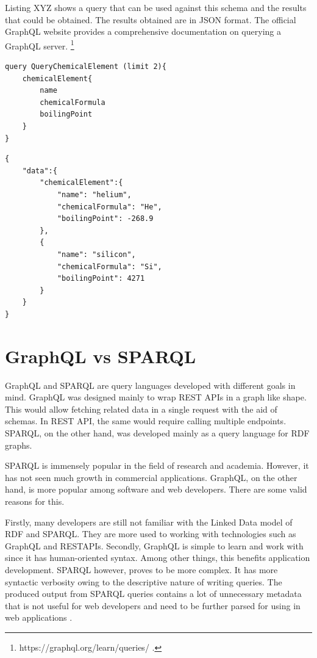 Listing XYZ shows a query that can be used against this schema and the results that could be obtained. The results obtained are in JSON format. The official GraphQL website provides a comprehensive documentation on querying a GraphQL server. \footnote{ https://graphql.org/learn/queries/ .} 

\begin{minipage}{\linewidth}
\begin{lstlisting}[label=listing:listing5, caption={Query to fetch chemical elements and their properties}]
query QueryChemicalElement (limit 2){
    chemicalElement{
		name
		chemicalFormula
		boilingPoint
	}
}
\end{lstlisting}
\end{minipage}

\begin{minipage}{\linewidth}
\begin{lstlisting}[label=listing:listing5, caption={Query to fetch chemical elements and their properties}]
{
	"data":{
		"chemicalElement":{
			"name": "helium",
			"chemicalFormula": "He",
			"boilingPoint": -268.9
		},
		{	
			"name": "silicon",
			"chemicalFormula": "Si",
			"boilingPoint": 4271
		}
	}
}

\end{lstlisting}
\end{minipage}

\section{GraphQL vs SPARQL}

GraphQL and SPARQL are query languages developed with different goals in mind. GraphQL was designed mainly to wrap REST APIs in a graph like shape. This would allow fetching related data in a single request with the aid of schemas. In REST API, the same would require calling multiple endpoints. SPARQL, on the other hand, was developed mainly as a query language for RDF graphs.

SPARQL is immensely popular in the field of research and academia. However, it has not seen much growth in commercial applications. GraphQL, on the other hand, is more popular among software and web developers. There are some valid reasons for this.  

Firstly, many developers are still not familiar with the Linked Data model of RDF and SPARQL. They are more used to working with technologies such as GraphQL and RESTAPIs. Secondly, GraphQL is simple to learn and work with since it has human-oriented syntax. Among other things, this benefits application development. SPARQL however, proves to be more complex. It has more syntactic verbosity owing to the descriptive nature of writing queries. The produced output from SPARQL queries contains a lot of unnecessary metadata that is not useful for web developers and need to be further parsed for using in web applications \cite{Lisena2018}. 

